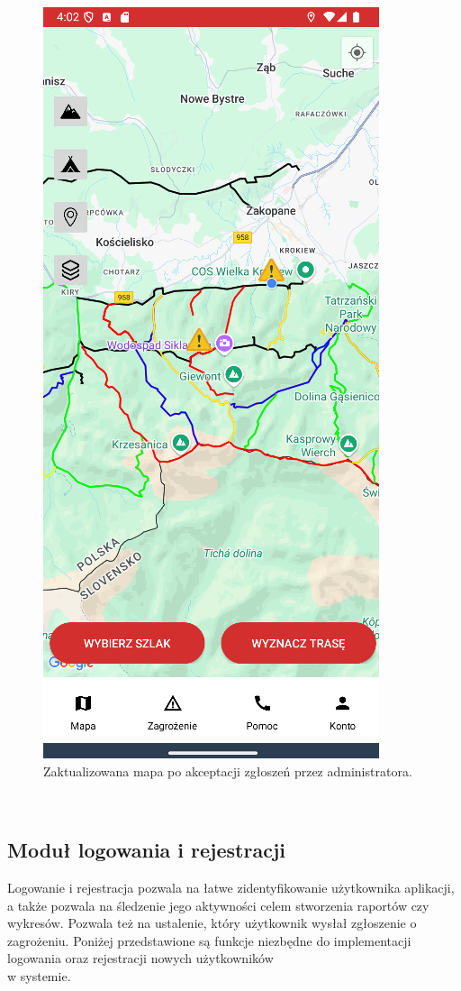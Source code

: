 \noindent
\setlength{\fboxrule}{0.5pt}
\begin{figure}[H]
    \centering
    \includegraphics[scale=0.6]{img/imp/test-accpeted.png}
    \caption{Zaktualizowana mapa po akceptacji zgłoszeń przez administratora.}
    \label{widok:markeraccepted1}
\end{figure}
\\
\subsection{Moduł logowania i rejestracji}
Logowanie i rejestracja pozwala na łatwe zidentyfikowanie użytkownika aplikacji, a także pozwala na śledzenie jego aktywności celem stworzenia raportów czy wykresów. Pozwala też na ustalenie, który użytkownik wysłał zgłoszenie o zagrożeniu. Poniżej przedstawione są funkcje niezbędne do implementacji logowania oraz rejestracji nowych użytkowników \\w systemie.
\\

